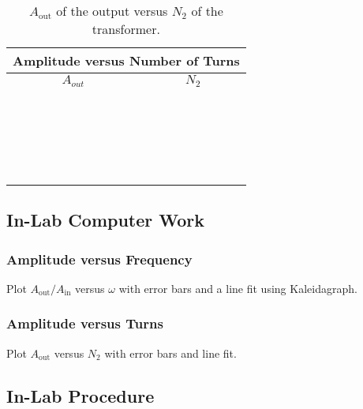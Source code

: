 \begin{table}[htb]
\begin{center}
\begin{tabular}{|c|c|}
\hline
\multicolumn{2}{|c|}{Amplitude versus Number of Turns}\\
\hline
$A_{out}$ & $N_2$ \\
\hline
\hspace*{5cm} & \hspace*{5cm}  \\
& \\
\hline       
& \\
& \\
\hline
& \\
& \\
\hline
& \\
& \\
\hline
& \\
& \\
\hline
& \\
& \\
\hline
& \\
& \\
\hline
& \\
& \\
\hline
& \\
& \\
\hline
& \\
& \\
\hline
\end{tabular}
\end{center}
\caption{$A_{\mbox{out}}$ of the output versus $N_2$ of the transformer.}
\label{tab:in:AvsN}
\end{table}

\subsection{In-Lab Computer Work}
\subsubsection{Amplitude versus Frequency}
Plot $A_{\mbox{out}}/A_{\mbox{in}}$ versus $\omega$ with 
error bars and a line fit using Kaleidagraph. 

\subsubsection{Amplitude versus Turns}
Plot $A_{\mbox{out}}$ 
versus $N_2$ with error bars and line fit.

\subsection{In-Lab Procedure}
